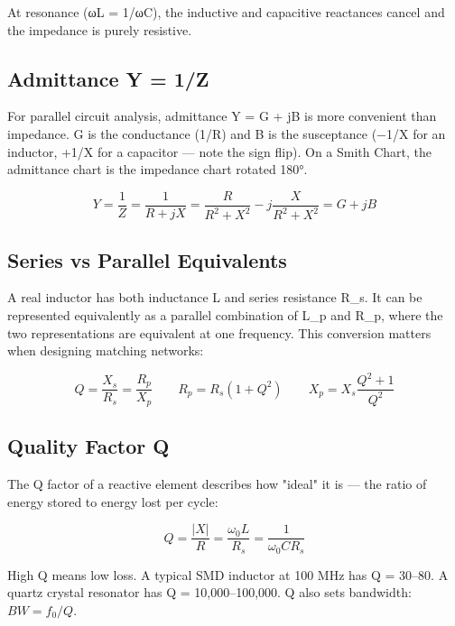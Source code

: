       

At resonance (ωL = 1/ωC), the inductive and capacitive reactances cancel and the impedance is purely resistive.

      

\subsection{Admittance Y = 1/Z}

      

For parallel circuit analysis, admittance Y = G + jB is more convenient than impedance. G is the conductance (1/R) and B is the susceptance (−1/X for an inductor, +1/X for a capacitor — note the sign flip). On a Smith Chart, the admittance chart is the impedance chart rotated 180°.

      
\[Y = \dfrac{1}{Z} = \dfrac{1}{R+jX} = \dfrac{R}{R^2+X^2} - j\dfrac{X}{R^2+X^2} = G + jB\]

      

\subsection{Series vs Parallel Equivalents}

      

A real inductor has both inductance L and series resistance R\_s. It can be represented equivalently as a parallel combination of L\_p and R\_p, where the two representations are equivalent at one frequency. This conversion matters when designing matching networks:

      
\[Q = \dfrac{X_s}{R_s} = \dfrac{R_p}{X_p} \qquad R_p = R_s(1+Q^2) \qquad X_p = X_s\dfrac{Q^2+1}{Q^2}\]

      

\subsection{Quality Factor Q}

      

The Q factor of a reactive element describes how "ideal" it is — the ratio of energy stored to energy lost per cycle:

      
\[Q = \dfrac{|X|}{R} = \dfrac{\omega_0 L}{R_s} = \dfrac{1}{\omega_0 C R_s}\]

      

High Q means low loss. A typical SMD inductor at 100 MHz has Q = 30–80. A quartz crystal resonator has Q = 10,000–100,000. Q also sets bandwidth: $BW = f_0/Q$.

